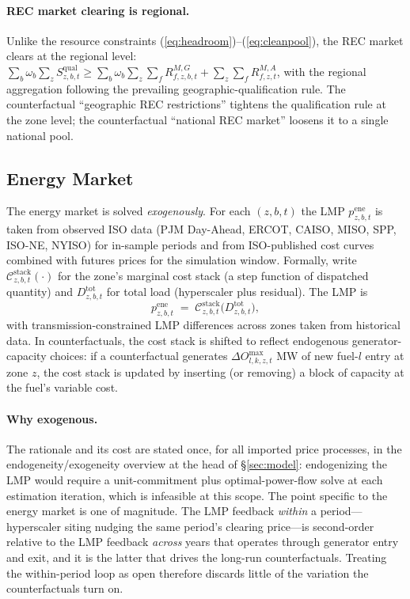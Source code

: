 \documentclass[12pt,letterpaper]{article}
\begin{document}
\paragraph{REC market clearing is regional.} Unlike the resource
constraints (\ref{eq:headroom})--(\ref{eq:cleanpool}), the REC market
clears at the regional level: $\sum_b \omega_b \sum_z S^{\text{qual}}_{z,b,t}
\geq \sum_b \omega_b \sum_z \sum_f R^{M,G}_{f,z,b,t} + \sum_z \sum_f
R^{M,A}_{f,z,t}$, with the regional aggregation following the prevailing
geographic-qualification rule. The counterfactual ``geographic REC
restrictions'' tightens the qualification rule at the zone level; the
counterfactual ``national REC market'' loosens it to a single national
pool.

\subsection{Energy Market}
\label{sec:energy_market}

The energy market is solved \emph{exogenously}. For each $(z,b,t)$ the LMP
$p^{\text{ene}}_{z,b,t}$ is taken from observed ISO data (PJM Day-Ahead,
ERCOT, CAISO, MISO, SPP, ISO-NE, NYISO) for in-sample periods and from
ISO-published cost curves combined with futures prices for the simulation
window. Formally, write $\mathcal{C}^{\text{stack}}_{z,b,t}(\cdot)$ for the
zone's marginal cost stack (a step function of dispatched quantity) and
$D^{\text{tot}}_{z,b,t}$ for total load (hyperscaler plus residual). The
LMP is
\begin{equation}
\label{eq:lmp}
p^{\text{ene}}_{z,b,t} \;=\; \mathcal{C}^{\text{stack}}_{z,b,t}\big(D^{\text{tot}}_{z,b,t}\big),
\end{equation}
with transmission-constrained LMP differences across zones taken from
historical data. In counterfactuals, the cost stack is shifted to reflect
endogenous generator-capacity choices: if a counterfactual generates
$\Delta O^{\max}_{l,k,z,t}$ MW of new fuel-$l$ entry at zone $z$, the cost
stack is updated by inserting (or removing) a block of capacity at the
fuel's variable cost.

\paragraph{Why exogenous.} The rationale and its cost are stated once, for all
imported price processes, in the endogeneity/exogeneity overview at the head of
\S\ref{sec:model}: endogenizing the LMP would require a unit-commitment plus
optimal-power-flow solve at each estimation iteration, which is infeasible at
this scope. The point specific to the energy market is one of magnitude. The
LMP feedback \emph{within} a period---hyperscaler siting nudging the same
period's clearing price---is second-order relative to the LMP feedback
\emph{across} years that operates through generator entry and exit, and it is
the latter that drives the long-run counterfactuals. Treating the within-period
loop as open therefore discards little of the variation the counterfactuals
turn on.
\end{document}

